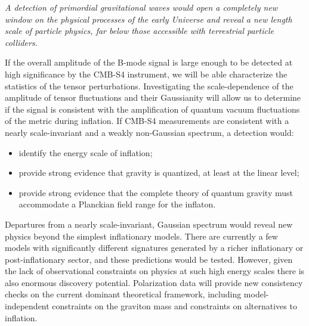 
{\it A detection of primordial gravitational waves would open a completely new window on the physical processes of the early Universe and reveal a new length scale of particle physics, far below those accessible with terrestrial particle colliders. }

If the overall amplitude of the B-mode signal is large enough to be detected at high significance by the CMB-S4 instrument, we will be able characterize the statistics of the tensor perturbations. Investigating the scale-dependence of the amplitude of tensor fluctuations and their Gaussianity will allow us to determine if the signal is consistent with the amplification of quantum vacuum fluctuations of the metric during inflation. If CMB-S4 measurements are consistent with a nearly scale-invariant and a weakly non-Gaussian spectrum, a detection would:
\begin{itemize}
 \item identify the energy scale of inflation;
 \item provide strong evidence that gravity is quantized, at least at the linear level;
 \item provide strong evidence that the complete theory of quantum gravity must accommodate a Planckian field range for the inflaton.
\end{itemize}

Departures from a nearly scale-invariant, Gaussian spectrum would reveal new physics beyond the simplest inflationary models. There are currently a few models with significantly different signatures generated by a richer inflationary or post-inflationary sector, and these predictions would be tested. However, given the lack of observational constraints on physics at such high energy scales there is also enormous discovery potential. Polarization data will provide new consistency checks on the current dominant theoretical framework, including model-independent constraints on the graviton mass and constraints on alternatives to inflation.

